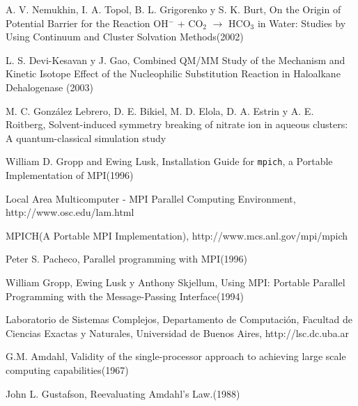 \documentclass[a4paper, 12pt]{article}
\begin{document}
\begin{thebibliography}{9}

A. V. Nemukhin, I. A. Topol, B. L. Grigorenko y S. K. Burt, On the Origin of Potential Barrier for the Reaction OH$^-$ + CO$_2$ $\rightarrow$ HCO$_3$ in Water: Studies by Using Continuum and Cluster Solvation
Methods(2002)

 L. S. Devi-Kesavan y J. Gao, Combined QM/MM Study of the Mechanism and Kinetic Isotope Effect
of the Nucleophilic Substitution Reaction in Haloalkane
Dehalogenase (2003)

 M. C. Gonz\'alez Lebrero, D. E.
Bikiel, M. D. Elola, D. A. Estrin y A. E. Roitberg,
Solvent-induced symmetry breaking of nitrate ion in aqueous
clusters: A quantum-classical simulation study

William D. Gropp and Ewing Lusk, Installation Guide for {\tt mpich}, a Portable Implementation of
{MPI}(1996)

Local Area Multicomputer - MPI Parallel Computing Environment, http://www.osc.edu/lam.html

MPICH(A Portable MPI Implementation), http://www.mcs.anl.gov/mpi/mpich

Peter S. Pacheco, Parallel programming with MPI(1996)

William Gropp, Ewing Lusk y Anthony Skjellum, Using MPI: Portable Parallel Programming with the Message-Passing
Interface(1994)

Laboratorio de Sistemas Complejos, Departamento de Computaci\'on, Facultad de Ciencias Exactas y Naturales, Universidad de Buenos Aires, http://lsc.dc.uba.ar

G.M. Amdahl, Validity of the single-processor approach to achieving large scale computing capabilities(1967)

John L. Gustafson, Reevaluating Amdahl's Law.(1988)

\end{thebibliography}
\end{document}
